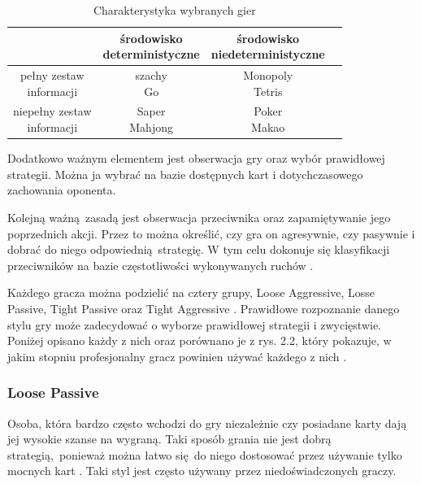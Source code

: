 \documentclass[12pt,oneside,a4paper]{report}
\begin{document}
\newpage
\begin{table}[h!]
\centering
\caption{Charakterystyka wybranych gier}
\begin{tabular}{|c|c|c|c| }
   \hline
    & \makecell{środowisko \\ deterministyczne} & \makecell{środowisko \\ niedeterministyczne} \\
    \hline
   \makecell{pełny zestaw \\ informacji} &  \makecell{szachy \\ Go } & \makecell{Monopoly \\ Tetris }\\ 
   \hline
   \makecell{niepełny zestaw \\ informacji} &  \makecell{Saper \\ Mahjong } & \makecell{Poker \\
   Makao}  \\  
   \hline
\end{tabular}
\end{table}

\vspace{0.8cm}
Dodatkowo ważnym elementem jest obserwacja gry oraz wybór prawidłowej strategii.
Można ja wybrać na bazie dostępnych kart i dotychczasowego zachowania oponenta.

Kolejną ważną zasadą jest obserwacja przeciwnika oraz zapamiętywanie jego
poprzednich akcji. Przez to można określić, czy gra on agresywnie, czy pasywnie i dobrać do 
niego odpowiednią strategię. W tym celu dokonuje się klasyfikacji przeciwników na 
bazie częstotliwości wykonywanych ruchów \cite{class}.

Każdego gracza można podzielić na cztery grupy, Loose Aggressive, Losse Passive, Tight
Passive oraz Tight Aggressive \cite{class}. Prawidłowe rozpoznanie danego stylu gry
może zadecydować o wyborze prawidłowej strategii i zwycięstwie. Poniżej opisano każdy z nich oraz
porównano je z rys. 2.2, który pokazuje, w jakim stopniu profesjonalny gracz powinien używać każdego
z nich \cite{class}. 

\subsubsection{Loose Passive}

Osoba, która bardzo często wchodzi do gry niezależnie czy posiadane karty dają jej
wysokie szanse na wygraną. 
Taki sposób grania nie jest dobrą strategią, ponieważ można łatwo się do niego 
dostosować przez używanie tylko mocnych kart \cite{class}. 
Taki styl jest często używany 
przez niedoświadczonych graczy.
\end{document}
